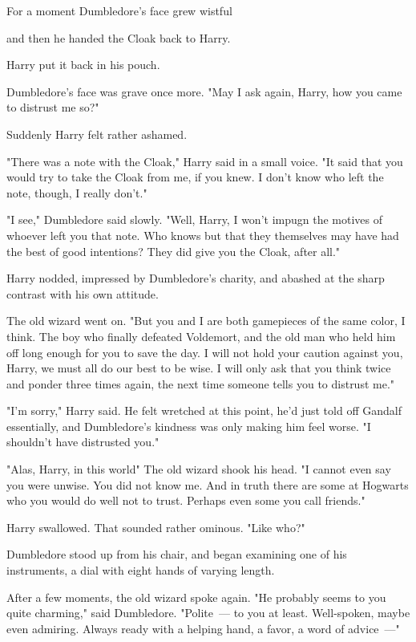 For a moment Dumbledore's face grew wistful{\el}

{\el} and then he handed the Cloak back to Harry.

Harry put it back in his pouch.

Dumbledore's face was grave once more. "May I ask again, Harry, how you came to
distrust me so?"

Suddenly Harry felt rather ashamed.

"There was a note with the Cloak," Harry said in a small voice. "It said that
you would try to take the Cloak from me, if you knew. I don't know who left the
note, though, I really don't."

"I{\el} see," Dumbledore said slowly. "Well, Harry, I won't impugn the
motives of whoever left you that note. Who knows but that they themselves may
have had the best of good intentions? They did give you the Cloak, after all."

Harry nodded, impressed by Dumbledore's charity, and abashed at the sharp
contrast with his own attitude.

The old wizard went on. "But you and I are both gamepieces of the same color, I
think. The boy who finally defeated Voldemort, and the old man who held him off
long enough for you to save the day. I will not hold your caution against you,
Harry, we must all do our best to be wise. I will only ask that you think twice
and ponder three times again, the next time someone tells you to distrust me."

"I'm sorry," Harry said. He felt wretched at this point, he'd just told off
Gandalf essentially, and Dumbledore's kindness was only making him feel worse.
"I shouldn't have distrusted you."

"Alas, Harry, in this world{\el}" The old wizard shook his head. "I cannot
even say you were unwise. You did not know me. And in truth there are some at
Hogwarts who you would do well not to trust. Perhaps even some you call
friends."

Harry swallowed. That sounded rather ominous. "Like who?"

Dumbledore stood up from his chair, and began examining one of his instruments,
a dial with eight hands of varying length.

After a few moments, the old wizard spoke again. "He probably seems to you
quite charming," said Dumbledore. "Polite~--- to you at least. Well-spoken, maybe
even admiring. Always ready with a helping hand, a favor, a word of advice~---"

